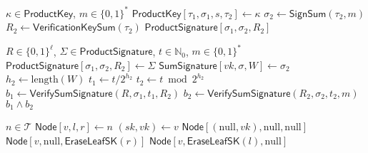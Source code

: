 \documentclass{article}
\begin{document}
\begin{algorithm}
\caption{$\mathsf{SignProduct}: \kappa,m \to \mathsf{\hyperref[def:ProductSignature]{ProductSignature}}  $}\label{alg:SignProduct}
\begin{algorithmic}[1]
\Require $\kappa \in \mathsf{\hyperref[def:ProductKey]{ProductKey}}$, $m\in\{0,1\}^*$
\State $\mathsf{\hyperref[def:ProductKey]{ProductKey}}[\tau_1,\sigma_1,s,\tau_2]\gets \kappa$
\State $\sigma_2\gets \mathsf{\hyperref[alg:SignSum]{SignSum}}(\tau_2,m)$
\State $R_2 \gets \mathsf{\hyperref[alg:VerificationKeySum]{VerificationKeySum}}(\tau_2)$
\State \Return $\mathsf{\hyperref[def:ProductSignature]{ProductSignature}}[\sigma_1,\sigma_2,R_2]$
\end{algorithmic}
\end{algorithm}

\begin{algorithm}
\caption{$\mathsf{VerifyProductSignature}: R,\Sigma,t,m \to \{\mathbf{true},\mathbf{false}\} $}\label{alg:VerifyProductSignature}
\begin{algorithmic}[1]
\Require $R\in\{0,1\}^\ell$, $\Sigma \in \mathsf{\hyperref[def:ProductSignature]{ProductSignature}}$, $t\in \mathbb{N}_0$,  $m\in\{0,1\}^*$
\State $\mathsf{\hyperref[def:ProductSignature]{ProductSignature}}[\sigma_1,\sigma_2,R_2]\gets \Sigma$
\State $\mathsf{\hyperref[def:SumSignature]{SumSignature}}[vk,\sigma,W] \gets \sigma_2$
\State $h_2 \gets \mathrm{length}(W)$
\State $t_1 \gets t / 2^{h_2}$
\State $t_2 \gets t \bmod 2^{h_2}$
\State $b_1 \gets \mathsf{\hyperref[alg:VerifySumSignature]{VerifySumSignature}}(R, \sigma_1, t_1, R_2)$
\State $b_2 \gets \mathsf{\hyperref[alg:VerifySumSignature]{VerifySumSignature}}(R_2, \sigma_2, t_2, m)$
\State \Return $b_1 \wedge b_2$
\end{algorithmic}
\end{algorithm}

\begin{algorithm}
\caption{$\mathsf{EraseLeafSK}: n \to \mathsf{\hyperref[def:Node]{Node}}  $}\label{alg:EraseLeafSK}
\begin{algorithmic}[1]
\Require $n\in \mathcal{T}$
\State $\mathsf{\hyperref[def:Node]{Node}}[v,l,r] \gets n$
    \State $(sk,vk)\gets v$
    \State \Return $\mathsf{\hyperref[def:Node]{Node}}[(\mathrm{null}, vk ), \mathrm{null}, \mathrm{null}]$
\Else
        \State \Return $\mathsf{\hyperref[def:Node]{Node}}[v,\mathrm{null},\mathsf{\hyperref[alg:EraseLeafSK]{EraseLeafSK}}(r)]$
    \Else
        \State \Return $\mathsf{\hyperref[def:Node]{Node}}[v,\mathsf{\hyperref[alg:EraseLeafSK]{EraseLeafSK}}(l),\mathrm{null}]$
    \EndIf
\EndIf
\end{algorithmic}
\end{algorithm}
\end{document}
